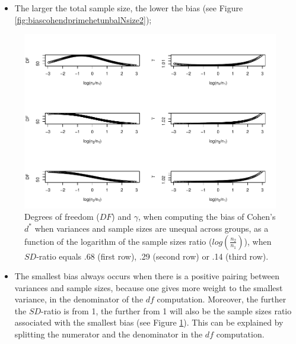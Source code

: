 \documentclass[
  english,
  man,mask]{apa6}
\providecommand{\tightlist}{%
  \setlength{\itemsep}{0pt}\setlength{\parskip}{0pt}}
\begin{document}
\begin{itemize}
\tightlist
\item
  The larger the total sample size, the lower the bias (see Figure \ref{fig:biascohendprimehetunbalNsize2});
\end{itemize}

\begin{figure}
\centering
\includegraphics{SupMat1_files/figure-latex/biascohendprimehetunbalnratiosdratio2-1.pdf}
\caption{\label{fig:biascohendprimehetunbalnratiosdratio2}Degrees of freedom (\(DF\)) and \(\gamma\), when computing the bias of Cohen's \(d^*\) when variances and sample sizes are unequal across groups, as a function of the logarithm of the sample sizes ratio (\(log \left( \frac{n_2}{n_1} \right)\)), when \(SD\)-ratio equals .68 (first row), .29 (second row) or .14 (third row).}
\end{figure}

\begin{itemize}
\tightlist
\item
  The smallest bias always occurs when there is a positive pairing between variances and sample sizes, because one gives more weight to the smallest variance, in the denominator of the \(df\) computation. Moreover, the further the \(SD\)-ratio is from 1, the further from 1 will also be the sample sizes ratio associated with the smallest bias (see Figure \ref{fig:biascohendprimehetunbalnratiosdratio2}). This can be explained by splitting the numerator and the denominator in the \(df\) computation.
\end{itemize}
\end{document}
